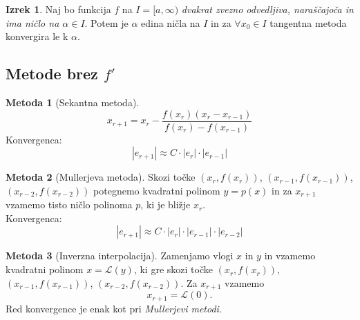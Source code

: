 \documentclass[11pt]{article}
\theoremstyle{definition}
\newtheorem{izrek}{Izrek}
\newtheorem*{metoda}{Metoda}
\begin{document}
\begin{izrek}

Naj bo funkcija $f$ na $I = [a, \infty)$ \textit{dvakrat zvezno odvedljiva, naraščajoča in ima ničlo na $\alpha \in I$}. Potem je $\alpha$ edina ničla na $I$ in za $\forall x_0 \in I$ tangentna metoda konvergira le k $\alpha$.

\end{izrek}
\vspace{0.5cm}


\subsection{Metode brez $f'$}
\vspace{0.5cm}


\begin{metoda}[Sekantna metoda]

$$x_{r+1} = x_r - \frac{f(x_r)(x_r - x_{r-1})}{f(x_r) - f(x_{r-1})}$$
Konvergenca:
$$|e_{r+1}| \approx C \cdot |e_r| \cdot |e_{r-1}|$$

\end{metoda}
\vspace{0.5cm}

\begin{metoda}[Mullerjeva metoda]

Skozi točke $(x_r, f(x_r))$, $(x_{r-1}, f(x_{r-1}))$, \\$(x_{r-2}, f(x_{r-2}))$ potegnemo kvadratni polinom $y = p(x)$ in za $x_{r+1}$ vzamemo tisto ničlo polinoma $p$, ki je bližje $x_r$. \\

\noindent Konvergenca:
$$|e_{r+1}| \approx C \cdot |e_r| \cdot |e_{r-1}| \cdot |e_{r-2}|$$

\end{metoda}
\vspace{0.5cm}

\begin{metoda}[Inverzna interpolacija]

Zamenjamo vlogi $x$ in $y$ in vzamemo kvadratni polinom $x = \mathcal{L}(y)$, ki gre skozi točke $(x_r, f(x_r))$, $(x_{r-1}, f(x_{r-1}))$, $(x_{r-2}, f(x_{r-2}))$. Za $x_{r+1}$ vzamemo
$$x_{r+1} = \mathcal{L}(0).$$
Red konvergence je enak kot pri \textit{Mullerjevi metodi}.

\end{metoda}
\vspace{0.5cm}


\pagebreak

\end{document}
